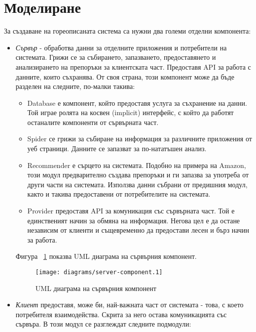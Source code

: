 \section{Моделиране}
	
	За създаване на гореописаната система са нужни два големи отделни компонента:
	
	\begin{itemize}
		\item \emph{Сървър} - обработва данни за отделните приложения и потребители на системата. Грижи се за събирането, запазването, предоставянето
		и анализирането на препоръки за клиентската част. Предоставя \ac{API} за работа с данните, които съхранява. От своя страна, този компонент
		може да бъде разделен на следните, по-малки такива:
		
		\begin{itemize}
			\item Database е компонент, който предоставя услуга за съхранение на данни. Той играе ролята на косвен (implicit) интерфейс, с който да работят останалите компоненти от сървърната част.
			\item Spider се грижи за събиране на информация за различните приложения от уеб страници. Данните се запазват за по-нататъшен анализ.
			\item Recommender е сърцето на системата. Подобно на примера на Amazon, този модул предварително създава препоръки и ги запазва за употреба
			от други части на системата. Използва данни събрани от предишния модул, както и такива предоставени от потребителите на системата.
			\item Provider предоставя \ac{API} за комуникация със сървърната част. Той е единственият начин за обмяна на информация. Негова цел е да остане независим от клиенти и същевременно да предостави лесен и бърз начин за работа.
		\end{itemize}
		
		Фигура ~\ref{figure:server-component} показва UML диаграма на сървърния компонент.
		
		\begin{figure}[htbp]
			\centering	
 			\texttt{[image: diagrams/server-component.1]}
			\caption{UML диаграма на сървърния компонент}
			\label{figure:server-component}
		\end{figure}
		
		
		\item \emph{Клиент} предоставя, може би, най-важната част от системата - това, с което потребителя взаимодейства. Скрита за него остава комуникацията със сървъра. В този модул се разглеждат следните подмодули:
		

\end{itemize}

